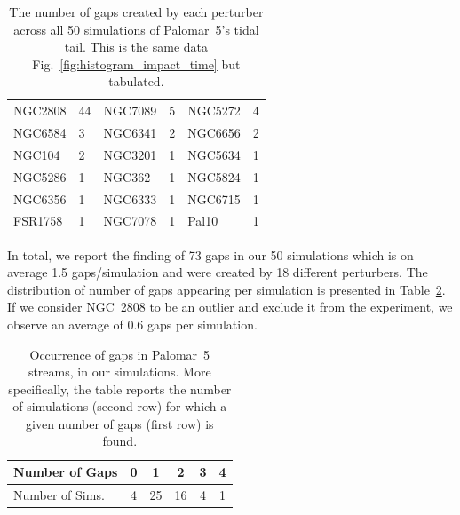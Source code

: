 \documentclass{aa}
\begin{document}
    \begin{table}[h]
      \centering
      \begin{tabular}{|ll|ll|ll|}
      \hline
      NGC2808 & 44 & NGC7089 & 5 & NGC5272 & 4 \\
      NGC6584 & 3 & NGC6341 & 2 & NGC6656 & 2 \\
      NGC104 & 2 & NGC3201 & 1 & NGC5634 & 1 \\
      NGC5286 & 1 & NGC362 & 1 & NGC5824 & 1 \\
      NGC6356 & 1 & NGC6333 & 1 & NGC6715 & 1 \\
      FSR1758 & 1 & NGC7078 & 1 & Pal10 & 1 \\
      \hline
      \end{tabular}
      \caption{The number of gaps created by each perturber across all 50 simulations of Palomar~5's tidal tail. This is the same data Fig.~\ref{fig:histogram_impact_time} but tabulated.}
      \label{tab:gaps_per_perturber}
    \end{table} 
    
    In total, we report the finding of 73 gaps in our 50 simulations which is on average 1.5 gaps/simulation and were created by 18 different perturbers. The distribution of number of gaps appearing per simulation is presented in Table~\ref{table:gap_distribution}. If we consider NGC~2808 to be an outlier and exclude it from the experiment, we observe an average of 0.6 gaps per simulation.  
    
    \begin{table}[h]
      \centering
        \begin{tabular}{|l|c|c|c|c|c|}
          \hline
          Number of Gaps & 0 & 1 & 2 & 3 & 4 \\
          \hline
          Number of Sims. & 4 & 25 & 16 & 4 & 1 \\
          \hline
        \end{tabular}
        \vspace{0.5cm}
      \caption{Occurrence of gaps in Palomar~5 streams,  in our simulations. More specifically, the table reports the number of simulations (second row) for which a given number of gaps (first row) is found. }\label{table:gap_distribution}
    \end{table}
\end{document}
